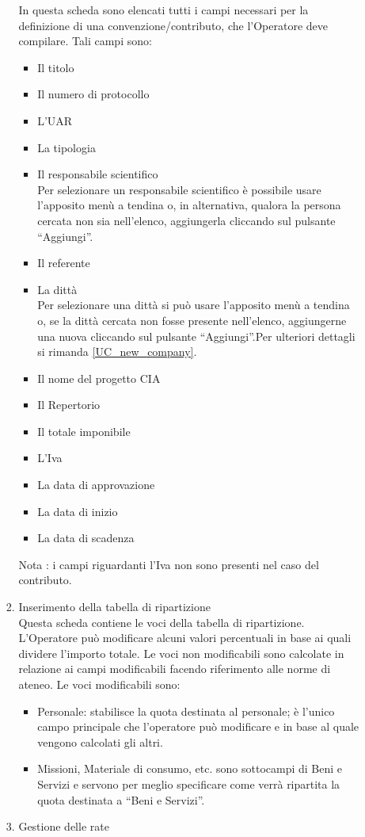 \begin{enumerate}
\begin{enumerate}
\begin{enumerate}
      In questa scheda sono elencati tutti i campi necessari per la definizione di una convenzione/contributo, 
      che l'Operatore deve compilare. Tali campi sono:
      \begin{itemize}
	\item Il titolo
	\item Il numero di protocollo
	\item L'UAR
	\item La tipologia
	\item Il responsabile scientifico\\
	  Per selezionare un responsabile scientifico è possibile usare l'apposito menù a tendina o, in alternativa, qualora la persona cercata non sia nell'elenco, aggiungerla cliccando sul pulsante ``Aggiungi''.
	\item Il referente
	\item La dittà\\
	  Per selezionare una dittà si può usare l'apposito menù a tendina o, se la dittà cercata non fosse presente nell'elenco, aggiungerne una nuova cliccando sul pulsante ``Aggiungi''.Per ulteriori dettagli si rimanda \ref{UC_new_company}.
	\item Il nome del progetto CIA
	\item Il Repertorio
	\item Il totale imponibile
	\item L'Iva
	\item La data di approvazione
	\item La data di inizio
	\item La data di scadenza
      \end{itemize}
      
      Nota : i campi riguardanti l'Iva non sono presenti nel caso del contributo.
      
    \item Inserimento della tabella di ripartizione\\
     
      Questa scheda contiene le voci della tabella di ripartizione. L'Operatore può modificare alcuni valori percentuali 
      in base ai quali dividere l'importo totale. Le voci non modificabili sono calcolate in relazione ai campi modificabili facendo riferimento alle norme di ateneo. Le voci modificabili sono:
      \begin{itemize}
	\item Personale: stabilisce la quota destinata al personale; è l'unico campo principale che l'operatore può modificare e in base al quale vengono calcolati gli altri.
	\item Missioni, Materiale di consumo, etc. sono sottocampi di Beni e Servizi e servono per meglio specificare come verrà ripartita la quota destinata a ``Beni e Servizi''.
      \end{itemize}
    \item Gestione delle rate\\
      

\end{enumerate}
\end{enumerate}
\end{enumerate}
